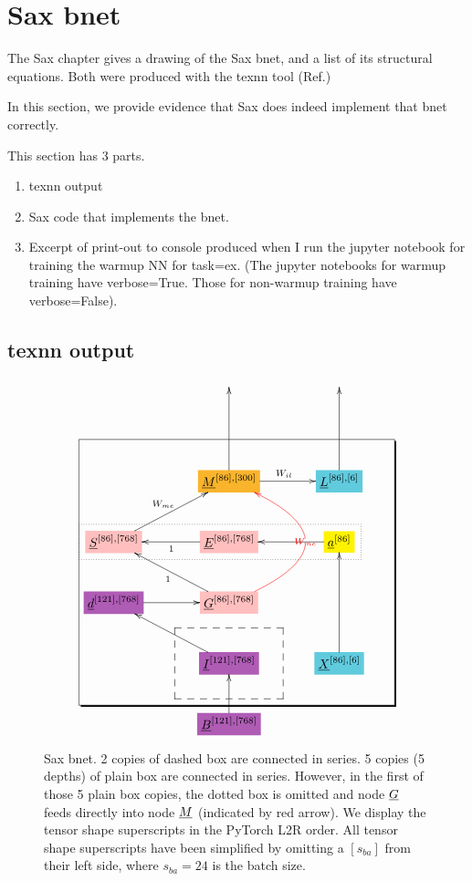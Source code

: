 \documentclass[12pt]{article}
\begin{document}
\section{Sax bnet}

The Sax chapter gives 
a drawing
of the Sax bnet,
and a list
of its structural
equations.
Both were produced with the texnn tool (Ref.\cite{texnn})

In this section,
we provide 
evidence that
 Sax
 does indeed implement
 that bnet correctly.

This section has 3 parts.

\begin{enumerate}

\item texnn output

\item Sax code
that implements the bnet.
\item Excerpt of print-out to console produced when I run
the jupyter notebook for training 
the warmup NN for task=ex. (The jupyter notebooks for warmup training have verbose=True. Those for non-warmup training have verbose=False).


\end{enumerate}

\subsection{texnn output}

\begin{figure}[h!]\centering
$$\xymatrix@R=2.5pc@C=3.5pc{
&&
\\
&&
\\
&*+[F*:Dandelion]{\underline{M}^{[86], [300]}}\ar[uu]\ar[r]^{W_{il}}&*+[F*:SkyBlue]{\underline{L}^{[86], [6]}}\ar[uu]
\\
*+[F*:pink]{\underline{S}^{[86], [768]}}\ar[ur]^{W_{me}}&*+[F*:pink]{\underline{E}^{[86], [768]}}\ar[l]^{1}&*+[F*:yellow]{\underline{a}^{[86]}}\ar[l]
\\
*+[F*:Orchid]{\underline{d}^{[121], [768]}}\ar[r]&*+[F*:pink]{\underline{G}^{[86], [768]}}\ar@[red]@/_5pc/[uu]|-{\color{red} W_{me}}\ar[ul]^{1}&
\\
&*+[F*:Orchid]{\underline{I}^{[121], [768]}}\ar[ul]&*+[F*:SkyBlue]{\underline{X}^{[86], [6]}}\ar[uu]
\\
&*+[F*:Orchid]{\underline{B}^{[121], [768]}}\ar[u]&
\save
\POS"3,1"."6,1"."3,3"."6,3"!C*+<4.8em>\frm{-,}
\POS"6,2"."6,2"."6,2"."6,2"!C*+<3.8em>\frm{--}
\POS"4,1"."4,1"."4,3"."4,3"!C*+<1.0em>\frm{.}
\restore
}$$
\caption{Sax bnet. 2 copies of dashed box are connected in series. 5 copies (5 depths) of plain box are connected in series.  However, in the first of those 5 plain box copies, the dotted box  is omitted and node $\underline{G}$ feeds directly into node  $\underline{M}$ (indicated by red arrow). We display the tensor shape superscripts in the PyTorch L2R order. All tensor shape superscripts have been simplified by omitting a $[s_{ba}]$ from their left side, where $s_{ba}=24$ is the batch size. }
\label{fig-texnn-for-sentence-ax-bnet}
\end{figure}
\end{document}
